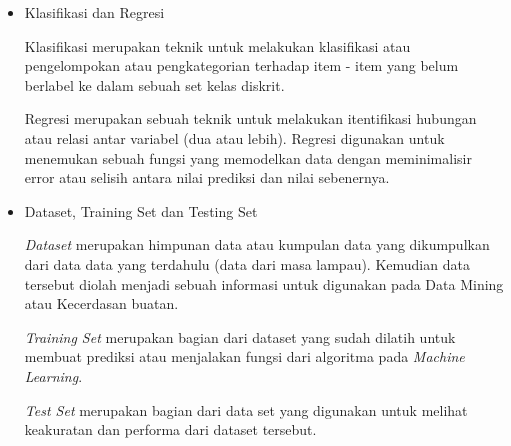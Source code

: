 \begin{enumerate}
\begin{itemize}
		      \item Klasifikasi dan Regresi
		            \par \setlength{\parindent}{10ex}
		            Klasifikasi merupakan teknik untuk melakukan klasifikasi atau pengelompokan atau pengkategorian terhadap item - item yang belum berlabel ke dalam sebuah set kelas diskrit.
		            \par Regresi merupakan sebuah teknik untuk melakukan itentifikasi hubungan atau relasi antar variabel (dua atau lebih). Regresi digunakan untuk menemukan sebuah fungsi yang memodelkan data dengan meminimalisir error atau selisih antara nilai prediksi dan nilai sebenernya.

		      \item Dataset, Training Set dan Testing Set
		            \par \setlength{\parindent}{10ex}
		            \emph{Dataset} merupakan himpunan data atau kumpulan data yang dikumpulkan dari data data yang terdahulu (data dari masa lampau). Kemudian data tersebut diolah menjadi sebuah informasi untuk digunakan pada Data Mining atau Kecerdasan buatan.
		            \par \emph{Training Set} merupakan bagian dari dataset yang sudah dilatih untuk membuat prediksi atau menjalakan fungsi dari algoritma pada \emph{Machine Learning}.
		            \par \emph{Test Set} merupakan bagian dari data set yang digunakan untuk melihat keakuratan dan performa dari dataset tersebut.

	      \end{itemize}
\end{enumerate}

